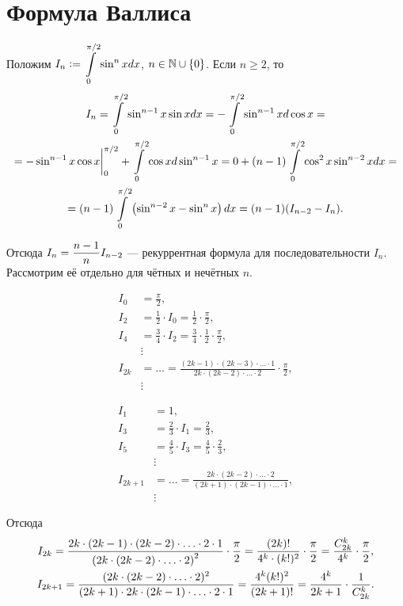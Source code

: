 \section{Формула Валлиса}

Положим $\displaystyle I_n \vcentcolon = \int\limits_0^{\pi / 2} \sin^nxdx$, $n \in \mathbb{N} \cup \{0\}$. Если $n \geqslant 2$, то
\begin{multline*}
    I_n = \int\limits_0^{\pi / 2}\sin^{n - 1}x\sin xdx = -\int\limits_0^{\pi / 2}\sin^{n - 1}xd\cos x =\\ = -\sin^{n - 1}x\cos x\bigg|_0^{\pi / 2} + \int\limits_0^{\pi / 2}\cos x d\sin^{n - 1}x = 0 + (n - 1)\int\limits_0^{\pi / 2}\cos^2x\sin^{n - 2}xdx =\\ = (n - 1)\int\limits_0^{\pi / 2}\left(\sin^{n - 2}x - \sin^nx\right)dx = (n - 1)(I_{n - 2} - I_n).
\end{multline*}

Отсюда $\displaystyle I_n = \frac{n - 1}{n}I_{n - 2}$ --- рекуррентная формула для последовательности $I_n$. Рассмотрим её отдельно для чётных и нечётных $n$.

\begin{minipage}{.5\textwidth}
    \begin{align*}
        I_0 &= \frac{\pi}{2},\\
        I_2 &= \frac{1}{2} \cdot I_0 = \frac{1}{2} \cdot \frac{\pi}{2},\\
        I_4 &= \frac{3}{4} \cdot I_2 = \frac{3}{4} \cdot \frac{1}{2} \cdot \frac{\pi}{2},\\
        &\vdots\\
        I_{2k} &= \ldots = \frac{(2k - 1) \cdot (2k - 3) \cdot \ldots \cdot 1}{2k \cdot (2k - 2) \cdot \ldots \cdot 2}\cdot\frac{\pi}{2},\\
        &\vdots
    \end{align*}
\end{minipage}
\begin{minipage}{.5\textwidth}
    \begin{align*}
        I_1 &= 1,\\
        I_3 &= \frac{2}{3} \cdot I_1 = \frac{2}{3},\\
        I_5 &= \frac{4}{5} \cdot I_3 = \frac{4}{5} \cdot \frac{2}{3},\\
        &\vdots\\
        I_{2k + 1} &= \ldots = \frac{2k \cdot (2k - 2) \cdot \ldots \cdot 2}{(2k + 1) \cdot (2k - 1) \cdot \ldots \cdot 1},\\
        &\vdots
    \end{align*}
\end{minipage}
Отсюда
\begin{gather*}
    I_{2k} = \frac{2k \cdot (2k - 1) \cdot (2k - 2) \cdot \ldots \cdot 2 \cdot 1}{\left(2k \cdot (2k - 2) \cdot \ldots \cdot 2\right)^2} \cdot \frac{\pi}{2} = \frac{(2k)!}{4^k\cdot (k!)^2}\cdot \frac{\pi}{2} = \frac{C_{2k}^k}{4^k}\cdot \frac{\pi}{2},\\
    I_{2k + 1} = \frac{(2k \cdot (2k - 2) \cdot \ldots \cdot 2)^2}{(2k + 1) \cdot 2k \cdot (2k - 1) \cdot \ldots \cdot 2 \cdot 1} = \frac{4^k(k!)^2}{(2k + 1)!} = \frac{4^k}{2k + 1}\cdot\frac{1}{C_{2k}^k}.
\end{gather*}

